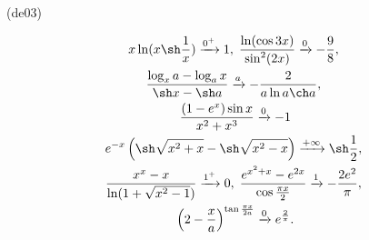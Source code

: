 \begin{tiny}(de03)\end{tiny}
\begin{multline*}
  x\ln(x\sh \frac{1}{x}) \xrightarrow{0^+}1 ,\; 
  \frac{\ln(\cos 3x)}{\sin^2(2x)}\xrightarrow{0} -\frac{9}{8} ,\; \\
  \frac{\log_x a - \log_a x}{\sh x - \sh a} \xrightarrow{a}-\frac{2}{a\ln a \ch a} ,\; \\
  \frac{(1-e^x)\sin x}{x^2+x^3}\xrightarrow{0} -1\\
  e^{-x}\left(\sh\sqrt{x^2+x}-\sh\sqrt{x^2-x} \right)\xrightarrow{+\infty}\sh \frac{1}{2} ,\; \\
  \frac{x^x-x}{\ln(1+\sqrt{x^2-1})}\xrightarrow{1^+} 0 ,\; 
  \frac{e^{x^2+x}-e^{2x}}{\cos\frac{\pi x}{2}}\xrightarrow{1} -\frac{2e^2}{\pi},\; \\
  \left(2-\frac{x}{a} \right)^{\tan\frac{\pi x}{2a}}\xrightarrow{0} e^{\frac{2}{\pi}}.
\end{multline*}

